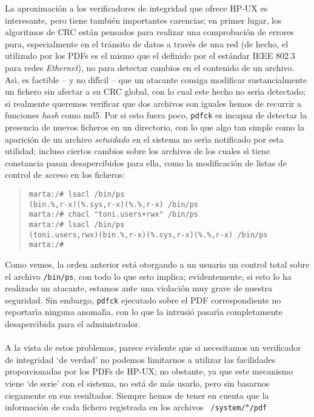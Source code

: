 La aproximaci\'on a los verificadores de integridad que ofrece HP-UX es
interesante, pero tiene tambi\'en importantes carencias; en primer lugar, los
algoritmos de CRC est\'an pensados para realizar una comprobaci\'on de errores
pura, especialmente en el tr\'ansito de datos a trav\'es de una red (de hecho,
el utilizado por los PDFs es el mismo que el definido por el est\'andar IEEE
802.3 para redes {\it Ethernet}), no para detectar cambios en el contenido de
un archivo. As\'{\i}, es factible -- y no dif\'{\i}cil -- que un atacante
consiga modificar sustancialmente un fichero sin afectar a su CRC global, con
lo cual este hecho no ser\'{\i}a detectado; si realmente queremos verificar que
dos archivos son iguales hemos de recurrir a funciones {\it hash} como {\sc
md5}. Por si esto fuera poco, {\tt pdfck} es incapaz de detectar la presencia
de nuevos ficheros en un directorio, con lo que algo tan simple como la 
aparici\'on de un archivo {\it setuidado} en el sistema no ser\'{\i}a notificado
por esta utilidad; incluso ciertos cambios sobre los archivos de los cuales 
s\'{\i} tiene constancia pasan desapercibidos para ella, como la modificaci\'on 
de listas de control de acceso en los ficheros:
\begin{quote}
\begin{verbatim}
marta:/# lsacl /bin/ps
(bin.%,r-x)(%.sys,r-x)(%.%,r-x) /bin/ps
marta:/# chacl "toni.users+rwx" /bin/ps
marta:/# lsacl /bin/ps
(toni.users,rwx)(bin.%,r-x)(%.sys,r-x)(%.%,r-x) /bin/ps
marta:/# 
\end{verbatim}
\end{quote}
Como vemos, la orden anterior est\'a otorgando a un usuario un control total
sobre el archivo {\tt /bin/ps}, con todo lo que esto implica; evidentemente,
si esto lo ha realizado un atacante, estamos ante una violaci\'on muy grave de 
nuestra seguridad. Sin embargo, {\tt pdfck} ejecutado sobre el PDF 
correspondiente no reportar\'{\i}a ninguna anomal\'{\i}a, con lo que la 
intrusi\'o pasar\'{\i}a completamente desapercibida para el administrador.\\
\\A la vista de estos problemas, parece evidente que si necesitamos un 
verificador de integridad `de verdad' no podemos limitarnos a utilizar las
facilidades proporcionadas por los PDFs de HP-UX; no obstante, ya que este
mecanismo viene `de serie' con el sistema, no est\'a de m\'as usarlo, pero sin
basarnos ciegamente en sus resultados. Siempre hemos de tener en cuenta que la
informaci\'on de cada fichero registrada en los archivos {\tt 
/system/$\ast$/pdf}
